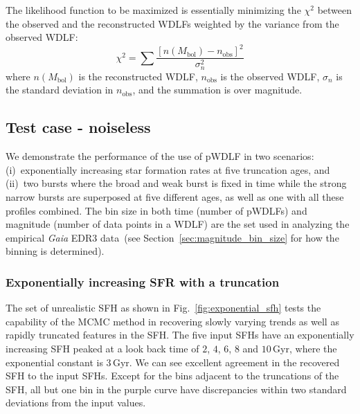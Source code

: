 \documentclass[fleqn,usenatbib]{mnras}
\begin{document}
The likelihood function to be maximized is essentially minimizing the $\chi^2$
between the observed and the reconstructed WDLFs weighted by the variance from
the observed WDLF:
\begin{equation}
    \chi^2 = \sum \frac{\left[n(M_\mathrm{bol}) - n_\mathrm{obs}\right]^2}{\sigma_n^2}
\end{equation}
where $n(M_\mathrm{bol})$ is the reconstructed WDLF, $n_\mathrm{obs}$ is the
observed WDLF, $\sigma_n$ is the standard deviation in $n_\mathrm{obs}$, and the
summation is over magnitude.


\subsection{Test case - noiseless}

We demonstrate the performance of the use of pWDLF in two scenarios:
(i)~exponentially increasing star formation rates at five truncation ages, and
(ii)~two bursts where the broad and weak burst is fixed in time while the strong
narrow bursts are superposed at five different ages, as well as one with all
these profiles combined. The bin size in both time (number of pWDLFs) and
magnitude (number of data points in a WDLF) are the set used in analyzing the
empirical \textit{Gaia} EDR3 data~(see Section~\ref{sec:magnitude_bin_size} for how
the binning is determined).

\subsubsection*{Exponentially increasing SFR with a truncation}
The set of unrealistic SFH as shown in Fig.~\ref{fig:exponential_sfh} tests the
capability of the MCMC method in recovering slowly varying trends as well as
rapidly truncated features in the SFH. The five input SFHs have an exponentially
increasing SFH peaked at a look back time of $2$, $4$, $6$, $8$ and $10$\,Gyr,
where the exponential constant is $3$\,Gyr. We can see excellent agreement in
the recovered SFH to the input SFHs. Except for the bins adjacent to
the truncations of the SFH, all but one bin in the purple curve have
discrepancies within two standard deviations from the input values. 
\end{document}
